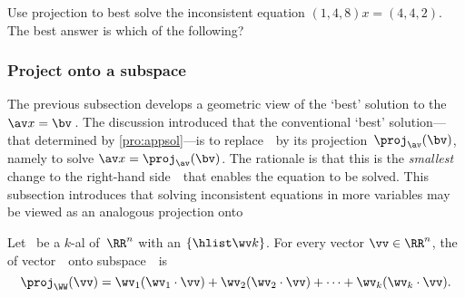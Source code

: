 \begin{activity}
Use projection to best solve the inconsistent equation \((1,4,8)x=(4,4,2)\). 
The best answer is which of the following?
\end{activity}











\subsubsection{Project onto a subspace}

The previous subsection develops a geometric view of the `best' solution to the  \(\av x=\bv\)\,.
The discussion introduced that the conventional `best' solution---that determined by \cref{pro:appsol}---is to replace~\bv\ by its projection~\(\proj_{\av}(\bv)\), namely to solve \(\av x=\proj_{\av}(\bv)\).
The rationale is that this is the \emph{smallest} change to the right-hand side~\bv\ that enables the equation to be solved.  
This subsection introduces that solving inconsistent equations in more variables may be viewed as an analogous projection onto 



\begin{definition} \label{def:orthproj}
Let \WW\ be a \(k\)-al  of~\(\RR^n\) with an  \(\{\hlist\wv k\}\).
For every vector \(\vv\in\RR^n\), the  of vector~\vv\ onto subspace~\WW\ is
\begin{equation*}
\proj_\WW(\vv)=\wv_1(\wv_1\cdot\vv)+\wv_2(\wv_2\cdot\vv)+\cdots+\wv_k(\wv_k\cdot\vv).
\end{equation*}
\end{definition}

